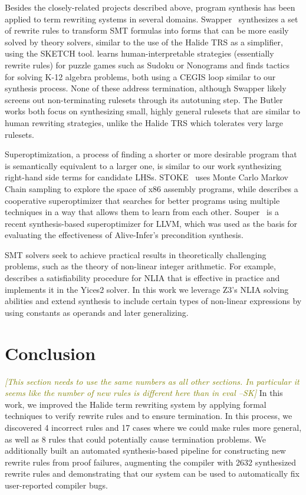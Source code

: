\documentclass[acmsmall,review,anonymous]{acmart}\settopmatter{printfolios=true,printccs=false,printacmref=false}
\newcommand{\sak}[1]{\textcolor{olive}{\textit{[{#1} --SK]}}}
\newcommand{\NumRulesFixed}{{\color{black} 4}\xspace}
\newcommand{\NumPredicatesRelaxed}{{\color{black} 17}\xspace}
\newcommand{\NumOrderingProblems}{{\color{black} 8}\xspace}
\newcommand{\NumRulesSynthesized}{{\color{black} 2632}\xspace}
\begin{document}
Besides the closely-related projects described above, program synthesis has been applied to term rewriting systems in several domains. Swapper~\cite{singh2016swapper} synthesizes a set of rewrite rules to transform SMT formulas into forms that can be more easily solved by theory solvers, similar to the use of the Halide TRS as a simplifier, using the SKETCH tool. \citet{butler2017synthesizing} learns human-interpretable strategies (essentially rewrite rules) for puzzle games such as Sudoku or Nonograms and \citet{butler2018framework} finds tactics for solving K-12 algebra problems, both using a CEGIS loop similar to our synthesis process. None of these address termination, although Swapper likely screens out non-terminating rulesets through its autotuning step. The Butler works both focus on synthesizing small, highly general rulesets that are similar to human rewriting strategies, unlike the Halide TRS which tolerates very large rulesets.

Superoptimization, a process of finding a shorter or more desirable program that is semantically equivalent to a larger one, is similar to our work synthesizing right-hand side terms for candidate LHSs. STOKE~\cite{schkufza2013stochastic} uses Monte Carlo Markov Chain sampling to explore the space of x86 assembly programs, while \citet{phothilimthana2016scaling} describes a cooperative superoptimizer that searches for better programs using multiple techniques in a way that allows them to learn from each other.  Souper~\cite{sasnauskas2017souper} is a recent synthesis-based superoptimizer for LLVM, which was used as the basis for evaluating the effectiveness of Alive-Infer's precondition synthesis.

SMT solvers seek to achieve practical results in theoretically challenging problems, such as the theory of non-linear integer arithmetic. For example, \citet{jovanovic2017solving} describes a satisfiability procedure for NLIA that is effective in practice and implements it in the Yices2 solver. In this work we leverage Z3's NLIA solving abilities and extend synthesis to include certain types of non-linear expressions by using constants as operands and later generalizing.

\section{Conclusion}
\sak{This section needs to use the same numbers as all other sections.  In
  particular it seems like the number of new rules is different here than in
  eval}
In this work, we improved the Halide term rewriting system by applying formal
techniques to verify rewrite rules and to ensure termination.  In this process,
we discovered \NumRulesFixed incorrect rules and \NumPredicatesRelaxed cases
where we could make rules more general, as well as \NumOrderingProblems rules
that could potentially cause termination problems.  We additionally built
an automated synthesis-based pipeline for constructing new rewrite rules from
proof failures, augmenting the compiler with \NumRulesSynthesized synthesized
rewrite rules and demonstrating that our system can be used to automatically fix
user-reported compiler bugs.
\end{document}

